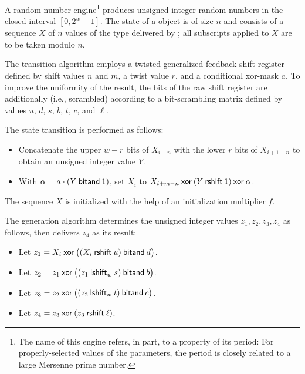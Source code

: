 \pnum
A  random number
engine\footnote{The name of this engine refers, in part, to a property of its period:
 For properly-selected values of the parameters,
 the period is closely related to a large Mersenne prime number.}
produces unsigned integer random numbers
in the closed interval $[0,2^w-1]$.
The
%
%
state
of a  object 
is of size $n$
and consists of a sequence $X$
of $n$ values of the type delivered by ;
all subscripts applied to $X$ are to be taken modulo $n$.

\pnum
The transition algorithm%
%
employs a twisted generalized feedback shift register
defined by shift values $n$ and $m$, a twist value $r$,
and a conditional xor-mask $a$.
To improve the uniformity of the result,
the bits of the raw shift register are additionally 
(i.e., scrambled) according to a bit-scrambling matrix
defined by values $u$, $d$, $s$, $b$, $t$, $c$, and $\ell$.

The state transition is performed as follows:
\begin{itemize}
 \item
   Concatenate
     the upper $w-r$ bits of $X_{i-n}$
   with
     the lower $r$ bits of $X_{i+1-n}$
   to obtain an unsigned integer value $Y$.
 \item
   With $\alpha = a \cdot (Y \mathbin{\mathsf{bitand}} 1)$,
   set $X_i$ to
     $X_{i+m-n} \mathbin{\mathsf{xor}} (Y \mathbin{\mathsf{rshift}} 1) \mathbin{\mathsf{xor}} \alpha$.
\end{itemize}
The sequence $X$ is initialized
with the help of an initialization multiplier $f$.

\pnum
The generation algorithm%
%
 determines the unsigned integer values $z_1, z_2, z_3, z_4$ as follows,
 then delivers $z_4$ as its result:
\begin{itemize}
 \item
   Let $z_1 = X_i \mathbin{\mathsf{xor}} \bigl(( X_i \mathbin{\mathsf{rshift}} u ) \mathbin{\mathsf{bitand}} d\bigr)$.
 \item
   Let $z_2 = z_1 \mathbin{\mathsf{xor}} \bigl( (z_1 \mathbin{\mathsf{lshift}_{w}} s) \mathbin{\mathsf{bitand}} b \bigr)$.
 \item
   Let $z_3 = z_2 \mathbin{\mathsf{xor}} \bigl( (z_2 \mathbin{\mathsf{lshift}_{w}} t) \mathbin{\mathsf{bitand}} c \bigr)$.
 \item
   Let $z_4 = z_3 \mathbin{\mathsf{xor}} ( z_3 \mathbin{\mathsf{rshift}} \ell )$.
\end{itemize}

